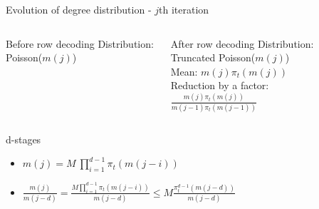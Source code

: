 \documentclass[10pt,xcolor=table]{beamer}
\begin{document}
		\begin{frame}{Evolution of degree distribution - $j$th iteration}
			\begin{columns}
				
				{\vspace{-6mm}
					\hspace{6mm}
					\begin{block}{Before row decoding}
						{\color{blue}Distribution}: Poisson($m(j)$) \\
					\end{block}}
					\vspace{6mm}
					\begin{block}{After row decoding}
						{\color{blue}Distribution}: Truncated Poisson($m(j)$) \\
						{\color{blue}Mean}: $m(j) \pi_t(m(j))$ \\
						{\color{blue}Reduction by a factor}: $\frac{m(j) \pi_t(m(j))}{m(j-1) \pi_t(m(j-1))}$ \\
					\end{block}
					\begin{center}
						\vspace{-3mm}
						
						
					\end{center}
			\end{columns}
				
				
				\begin{block}{d-stages}
					
					\begin{center}
						\begin{itemize}
							\item  $m(j)= M \ \prod \limits_{i=1}^{d-1}{\pi_t(m(j-i))}$
							\item $\frac{m(j)}{m(j-d)}=\frac{M\prod\limits_{i=1}^{d-1} \pi_t(m(j-i))}{m(j-d)} \leq M \frac{\pi_t^{d-1}(m(j-d))}{m(j-d)}$
						\end{itemize}
					\end{center}
					
				\end{block}
			\end{frame}
\end{document}
